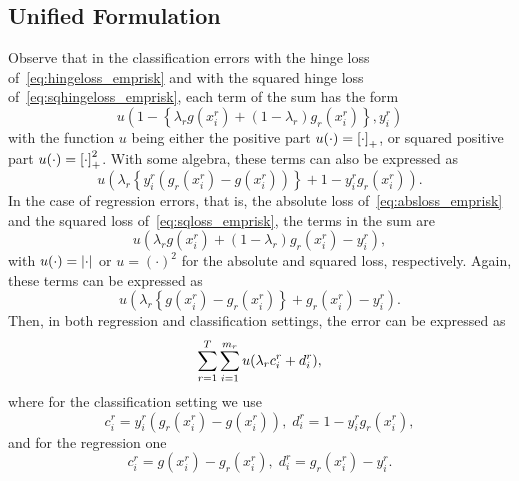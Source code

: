 \subsection{Unified Formulation}
Observe that in the classification errors with the hinge loss of~\eqref{eq:hingeloss_emprisk} and with the squared hinge loss of~\eqref{eq:sqhingeloss_emprisk}, each term of the sum has the form
\begin{equation}
    \nonumber
    u\left(1 - \left\{\lambda_r g(x_i^r) + (1-\lambda_r) g_r(x_i^r)  \right\} ,y_i^r\right)
\end{equation}
with the function $u$ being either the positive part $u(\cdot)=\left[\cdot\right]_{+}$, or squared positive part $u(\cdot)=\left[\cdot\right]_{+}^2$.
With some algebra, these terms can also be expressed as
\begin{equation}
    \nonumber
    u\left(\lambda_r \left\{ y_i^r (g_r(x_i^r) - g(x_i^r)) \right\} +  1 - y_i^r g_r(x_i^r) \right).
\end{equation}
In the case of regression errors, that is, the absolute loss of~\eqref{eq:absloss_emprisk} and the squared loss of~\eqref{eq:sqloss_emprisk}, the terms in the sum are
\begin{equation}
    \nonumber
    u\left(\lambda_r g(x_i^r) + (1-\lambda_r)g_r(x_i^r) - y_i^r\right) ,
\end{equation}
with $u(\cdot)=\left|\cdot\right|$ or $u=(\cdot)^2$ for the absolute and squared loss, respectively. Again, these terms can be expressed as 
\begin{equation}
    \nonumber
    u\left(\lambda_r \left\{ g(x_i^r) - g_r(x_i^r) \right\} +  g_r(x_i^r) - y_i^r \right) .
\end{equation}
Then, in both regression and classification settings, the error can be expressed as
\begin{equation}
    \nonumber
    \sum_{r=1}^T \sum_{i=1}^{m_r} u(\lambda_r c_i^r + d_i^r) ,
\end{equation}
where for the classification setting we use
\begin{equation}
    \label{eq:changevar_clas}
    c_i^r =  y_i^r (g_r(x_i^r) - g(x_i^r))  , \;  d_i^r =  1 - y_i^r g_r(x_i^r) ,
\end{equation}
and for the regression one\begin{equation}
    \label{eq:changevar_reg}
    c_i^r = g(x_i^r) - g_r(x_i^r)  , \;  d_i^r =  g_r(x_i^r) - y_i^r .
\end{equation}


